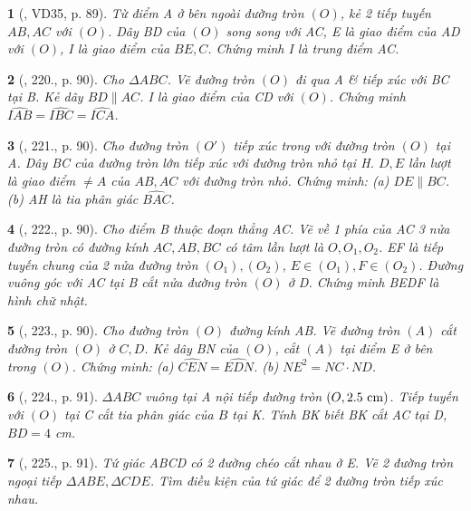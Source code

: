 \documentclass{article}
\newtheorem{baitoan}{}
\begin{document}
\begin{baitoan}[\cite{Binh_Toan_9_tap_2}, VD35, p. 89]
	Từ điểm A ở bên ngoài đường tròn $(O)$, kẻ 2 tiếp tuyến $AB,AC$ với $(O)$. Dây BD của $(O)$ song song với AC, E là giao điểm của AD với $(O)$, I là giao điểm của $BE,C$. Chứng minh I là trung điểm AC.
\end{baitoan}

\begin{baitoan}[\cite{Binh_Toan_9_tap_2}, 220., p. 90]
	Cho $\Delta ABC$. Vẽ đường tròn $(O)$ đi qua A \& tiếp xúc với BC tại B. Kẻ dây $BD\parallel AC$. I là giao điểm của CD với $(O)$. Chứng minh $\widehat{IAB} = \widehat{IBC} = \widehat{ICA}$.
\end{baitoan}

\begin{baitoan}[\cite{Binh_Toan_9_tap_2}, 221., p. 90]
	Cho đường tròn $(O')$ tiếp xúc trong với đường tròn $(O)$ tại A. Dây BC của đường tròn lớn tiếp xúc với đường tròn nhỏ tại H. $D,E$ lần lượt là giao điểm $\ne A$ của $AB,AC$ với đường tròn nhỏ. Chứng minh: (a) $DE\parallel BC$. (b) AH là tia phân giác $\widehat{BAC}$.
\end{baitoan}

\begin{baitoan}[\cite{Binh_Toan_9_tap_2}, 222., p. 90]
	Cho điểm B thuộc đoạn thẳng AC. Vẽ về 1 phía của AC 3 nửa đường tròn có đường kính $AC,AB,BC$ có tâm lần lượt là $O,O_1,O_2$. EF là tiếp tuyến chung của 2 nửa đường tròn $(O_1),(O_2)$, $E\in(O_1),F\in(O_2)$. Đường vuông góc với AC tại B cắt nửa đường tròn $(O)$ ở D. Chứng minh BEDF là hình chữ nhật.
\end{baitoan}

\begin{baitoan}[\cite{Binh_Toan_9_tap_2}, 223., p. 90]
	Cho đường tròn $(O)$ đường kính AB. Vẽ đường tròn $(A)$ cắt đường tròn $(O)$ ở $C,D$. Kẻ dây BN của $(O)$, cắt $(A)$ tại điểm E ở bên trong $(O)$. Chứng minh: (a) $\widehat{CEN} = \widehat{EDN}$. (b) $NE^2 = NC\cdot ND$.
\end{baitoan}

\begin{baitoan}[\cite{Binh_Toan_9_tap_2}, 224., p. 91]
	$\Delta ABC$ vuông tại A nội tiếp đường tròn $(O,2.5\ {\rm cm})$. Tiếp tuyến với $(O)$ tại C cắt tia phân giác của $\widehat{B}$ tại K. Tính BK biết BK cắt AC tại D, $BD = 4$ {\rm cm}.
\end{baitoan}

\begin{baitoan}[\cite{Binh_Toan_9_tap_2}, 225., p. 91]
	Tứ giác ABCD có 2 đường chéo cắt nhau ở E. Vẽ 2 đường tròn ngoại tiếp $\Delta ABE,\Delta CDE$. Tìm điều kiện của tứ giác để 2 đường tròn tiếp xúc nhau.
\end{baitoan}
\end{document}
